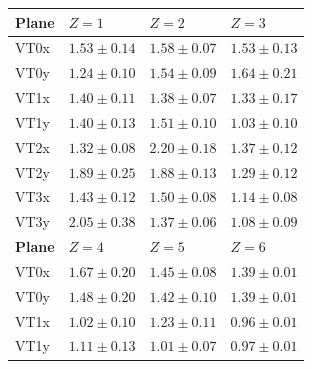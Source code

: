 \vspace*{\fill}
\begin{table}[H]
	\centering
	{\normalsize%
		\begin{tabular}{M{1.8cm} M{2.1cm} M{2.1cm} M{2.1cm}}
			\hline
			\textbf{Plane} & \textbf{$Z=1$} & \textbf{$Z=2$} & \textbf{$Z=3$} \\
			\hline
			VT0x & $1.53 \pm 0.14$ & $1.58 \pm 0.07$ & $1.53 \pm 0.13$ \\
			VT0y & $1.24 \pm 0.10$ & $1.54 \pm 0.09$ & $1.64 \pm 0.21$ \\
			VT1x & $1.40 \pm 0.11$ & $1.38 \pm 0.07$ & $1.33 \pm 0.17$ \\
			VT1y & $1.40 \pm 0.13$ & $1.51 \pm 0.10$ & $1.03 \pm 0.10$ \\
			VT2x & $1.32 \pm 0.08$ & $2.20 \pm 0.18$ & $1.37 \pm 0.12$ \\
			VT2y & $1.89 \pm 0.25$ & $1.88 \pm 0.13$ & $1.29 \pm 0.12$ \\
			VT3x & $1.43 \pm 0.12$ & $1.50 \pm 0.08$ & $1.14 \pm 0.08$ \\
			VT3y & $2.05 \pm 0.38$ & $1.37 \pm 0.06$ & $1.08 \pm 0.09$ \\
			\hline\hline
			\textbf{Plane} & \textbf{$Z=4$} & \textbf{$Z=5$} & \textbf{$Z=6$} \\
			\hline
			VT0x & $1.67 \pm 0.20$ & $1.45 \pm 0.08$ & $1.39 \pm 0.01$ \\
			VT0y & $1.48 \pm 0.20$ & $1.42 \pm 0.10$ & $1.39 \pm 0.01$ \\
			VT1x & $1.02 \pm 0.10$ & $1.23 \pm 0.11$ & $0.96 \pm 0.01$ \\
			VT1y & $1.11 \pm 0.13$ & $1.01 \pm 0.07$ & $0.97 \pm 0.01$ \\

\end{tabular}}
\end{table}
